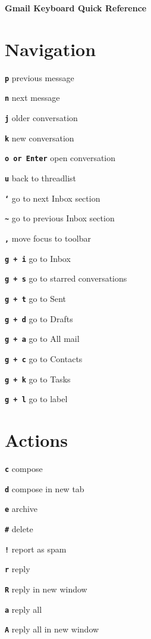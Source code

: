 \documentclass[11pt,letterpaper]{article}
\newcommand{\sck}[1]{\textbf{\texttt{#1}}}
\begin{document}
\begin{center}
\textbf{\large Gmail Keyboard Quick Reference}
\end{center}



\section*{Navigation}

\sck{p} \dotfill previous message

\sck{n} \dotfill next message

\sck{j} \dotfill older conversation	

\sck{k} \dotfill new conversation	

\sck{o or Enter} \dotfill open conversation	

\sck{u} \dotfill back to threadlist	

\sck{`} \dotfill go to next Inbox section	

\sck{\textasciitilde} \dotfill go to previous Inbox section

\sck{,} \dotfill move focus to toolbar

\sck{g + i} \dotfill go to Inbox	

\sck{g + s} \dotfill go to starred conversations	

\sck{g + t} \dotfill go to Sent	

\sck{g + d} \dotfill go to Drafts	

\sck{g + a} \dotfill go to All mail	

\sck{g + c} \dotfill go to Contacts	

\sck{g + k} \dotfill go to Tasks	

\sck{g + l} \dotfill go to label


\section*{Actions}

\sck{c} \dotfill compose	

\sck{d} \dotfill compose in new tab	

\sck{e} \dotfill archive

\sck{\#} \dotfill delete

\sck{!} \dotfill report as spam

\sck{r} \dotfill reply

\sck{R} \dotfill reply in new window

\sck{a} \dotfill reply all

\sck{A} \dotfill reply all in new window
\end{document}
